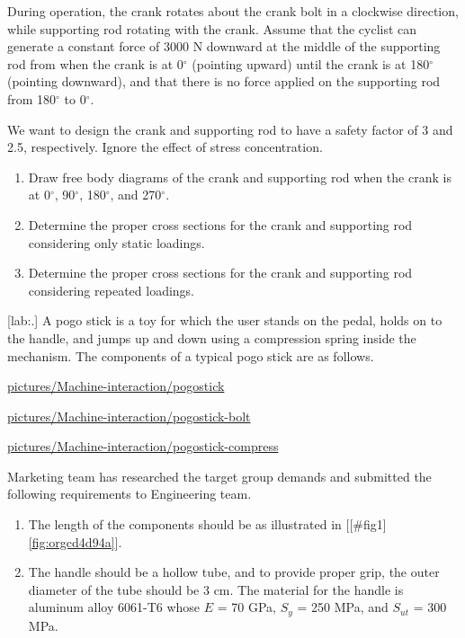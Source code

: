 \documentclass[a4paper,openany,12pt]{book}
\begin{document}
{{During operation, the crank rotates about the crank bolt in a clockwise
direction, while supporting rod rotating with the crank. Assume that the
cyclist can generate a constant force of 3000 N downward at the middle
of the supporting rod from when the crank is at 0\(^{\circ}\) (pointing
upward) until the crank is at 180\(^{\circ}\) (pointing downward), and
that there is no force applied on the supporting rod from 180\(^{\circ}\)
to 0\(^{\circ}\).

We want to design the crank and supporting rod to have a safety factor
of 3 and 2.5, respectively. Ignore the effect of stress concentration.

\begin{enumerate}
\item Draw free body diagrams of the crank and supporting rod when the
crank is at 0\(^{\circ}\), 90\(^{\circ}\), 180\(^{\circ}\), and
270\(^{\circ}\).

\item Determine the proper cross sections for the crank and supporting rod
considering only static loadings.

\item Determine the proper cross sections for the crank and supporting rod
considering repeated loadings.
\end{enumerate}

[lab:.] A pogo stick is a toy for
which the user stands on the pedal, holds on to the handle, and jumps up
and down using a compression spring inside the mechanism. The components
of a typical pogo stick are as follows.


\url{pictures/Machine-interaction/pogostick}

\hfill

\url{pictures/Machine-interaction/pogostick-bolt}

\url{pictures/Machine-interaction/pogostick-compress}

Marketing team has researched the target group demands and submitted the
following requirements to Engineering team.

\begin{enumerate}
\item The length of the components should be as illustrated in
[[\#fig1]\ref{fig:orgcd4d94a}].

\item The handle should be a hollow tube, and to provide proper grip, the
outer diameter of the tube should be 3 cm. The material for the
handle is aluminum alloy 6061-T6 whose \(E\) = 70 GPa, \(S_y\) = 250 MPa,
and \(S_{ut}\) = 300 MPa.


\end{enumerate}}}
\end{document}
